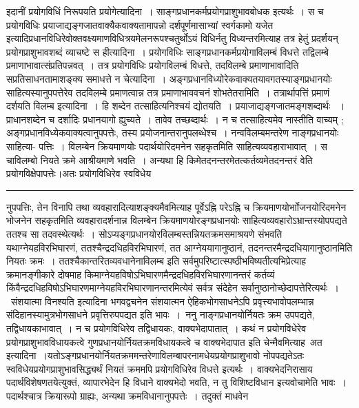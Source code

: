 \documentclass[11pt, openany]{book}
\begin{document}
 इदानीं प्रयोगविधिं निरूपयति {\br प्रयोगेत्यादिना~।} साङ्गप्रधानकर्मप्रयोगप्राशुभावबोधक इत्यर्थः~। स च प्रयोगविधिः प्रयाजाद्यङ्गजातवाक्यैकवाक्यतामापन्नो {\qt दर्शपूर्णमासाभ्यां स्वर्गकामो यजेत} इत्यादिप्रधानविधिरेवोक्तवक्ष्यमाणविधित्रयमेलनरूपश्चतुर्थोऽयं विधिर्नतु विध्यन्तरमित्याह तत्र हेतुं प्रदर्शयन्
प्रयोगप्राशुभावशब्दं व्याचष्टे {\br स हीत्यादिना~।}  प्रयोगविधिः साङ्गप्रधानकर्मप्रयोगाविलम्बं विधत्ते तद्विलम्बे प्रमाणाभावात्संप्रतिपन्नवत्~। तत्र प्रयोगविधिः प्रयोगविलम्बं विधत्ते, तदविलम्बे प्रमाणाभावादिति सप्रतिसाधनतामाशङ्क्य समाधत्ते {\br न चेत्यादिना~।} अङ्गप्रधानविध्योरेकवाक्यतयावगतस्याङ्गप्रधानयोः साहित्यस्यानुपपत्तेरेव तदविलम्बे प्रमाणत्वान्न तत्र प्रमाणाभाववचनं शोभतेतरामिति~। तत्रार्थापत्तिं प्रमाणं दर्शयति {\br विलम्ब इत्यादिना~।} {\qt हि} शब्देन तत्साहित्यनिश्चयं द्योतयति~। प्रयाजाद्यङ्गजातमङ्गशब्दार्थः ~। प्राधानशब्देन च दर्शादिः प्रधानयागो ह्युच्यते~। तावेव तच्छब्दार्थः~। न  च तत्साहित्यमेव नास्तीति वाच्यम् ; अङ्गप्रधानविध्येकवाक्यत्वानुपपत्तेः, तस्य प्रयोजनान्तरानुपलब्धेश्च~। {\br नन्व}विलम्बमन्तरेण नाङ्गप्रधानयोः साहित्या-
\newpage
\fancyhead[LO]{विधिः ]}
{\bl\noindent पत्तिः~। विलम्बेन क्रियमाणयोः पदार्थयोरिदमनेन सहकृतमिति साहित्यव्यवहाराभावात्~। स चाविलम्बो नियते क्रमे आश्रीयमाणे भवति~। अन्यथा हि किमेतदनन्तरमेतत्कर्तव्यमेतदनन्तरं वेति प्रयोगविक्षेपापत्तेः।अतः प्रयोगविधिरेव स्वविधेय\\}
\hrule
\vspace{3mm}
\noindent
नुपपत्तिः, तेन विनापि तथा व्यवहारादित्याशङ्क्यमैवमित्याह पूर्वेऽह्नि परेऽह्नि  च क्रियमाणयोर्भाोजनयोरिदमनेन भोजनेन सहकृतमिति व्यवहारादर्शनान्न विलम्बेन क्रियमाणयोरङ्गप्रधानयोः साहित्यव्यवहारोऽभ्रान्तस्योपपद्यते ततश्च सा तदवस्थेत्यर्थः~। सोऽप्यङ्गप्रधानयोरविलम्बस्तन्नियतक्रमसमाश्रयणे संभवति यथाग्नेयहविरभिघारणं, ततश्चैन्द्रदधिहविरभिघारणं, तत आग्नेययागानुष्ठानं, तदनन्तरमैन्द्रदधियागानुष्ठानमिति नियतः क्रमः~। ततश्चैकान्तरितव्यवधानेनाविलम्ब इति सर्वमुपरिष्टात्स्पष्ठीभविष्यतीत्यभिप्रेत्याह  क्रमानङ्गीकारे दोषमाह किमाग्नेयहविषोऽभिघारणमैन्द्रदधिहविरभिघारणानन्तरं कर्तव्यं किंवैन्द्रदधिहविषोऽभिघारणमाग्नेयहविरभिघारणानन्तरमित्येवं सर्वत्र संदेहेन सर्वानुष्ठानोच्छेदापत्तेरित्यर्थः~।~{\qt संशयात्मा विनश्यति} इत्यादिना भगवद्वचनेन संशयात्मन ऐहिकभोगसाधनेऽपि प्रवृत्त्यभावोपलम्भान्न संदिहानस्यामुत्रभोगसाधने प्रवृत्तिरुपपद्यत इति भावः~।~{\br ननु} नाङ्गप्रधानयोर्नियतः क्रम उपपद्यते, तद्विधायकाभावात्~। न च प्रयोगविधिरेव तद्विधायकः, वाक्यभेदापातात्~। कथं न प्रयोगविधेरेव
प्रयोगप्राशुभावविधायकत्वे गुणप्रधानयोर्नियतक्रमविधायकत्वे च वाक्यभेदापात इति चेन्मैवमित्याह\textendash\ {\br अत इत्यादिना~।}यतोऽङ्गप्रधानयोर्नियतक्रममन्तरेणाविलम्बापरनामधेयप्रयोगप्राशुभावो नोपपद्यतेऽतः स्वविधेयप्रयोगप्राशुभावसिद्ध्यर्थं नियतं क्रममपि प्रयोगविधिरेव विधत्ते इत्यर्थः~। वाक्यभेदनिरासाय पदार्थविशेषणतयेत्युक्तं, व्यापारभेदेन हि विधाने वाक्यभेदो भवति, न तु विशिष्टविधान इत्यवोचामेति भावः~। पदार्थश्चात्र क्रियारूपो ग्राह्यः, अन्यथा क्रमविधानानुपपत्तेः~। तदुक्तं माधवेन
\end{document}
